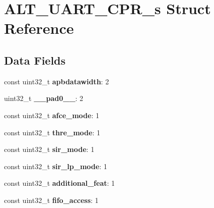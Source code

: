 \hypertarget{structALT__UART__CPR__s}{}\section{A\+L\+T\+\_\+\+U\+A\+R\+T\+\_\+\+C\+P\+R\+\_\+s Struct Reference}
\label{structALT__UART__CPR__s}
\subsection*{Data Fields}
\begin{DoxyCompactItemize}
\item 
\mbox{\label{structALT__UART__CPR__s_a5849f15933025a5b31f5bd877a296767}} 
const uint32\+\_\+t {\bfseries apbdatawidth}\+: 2
\item 
\mbox{\label{structALT__UART__CPR__s_ad73e5bea3527caaa2db495330cb9f0c0}} 
uint32\+\_\+t {\bfseries \+\_\+\+\_\+pad0\+\_\+\+\_\+}\+: 2
\item 
\mbox{\label{structALT__UART__CPR__s_a10cb860c4f7a423b00450eb90df72d30}} 
const uint32\+\_\+t {\bfseries afce\+\_\+mode}\+: 1
\item 
\mbox{\label{structALT__UART__CPR__s_ad19161f5074f440356b542fc1ffb2199}} 
const uint32\+\_\+t {\bfseries thre\+\_\+mode}\+: 1
\item 
\mbox{\label{structALT__UART__CPR__s_a2607a5fb15ea51166c56546d51aa8bc8}} 
const uint32\+\_\+t {\bfseries sir\+\_\+mode}\+: 1
\item 
\mbox{\label{structALT__UART__CPR__s_a7ad87fd35f74fc946af40274ff95d05a}} 
const uint32\+\_\+t {\bfseries sir\+\_\+lp\+\_\+mode}\+: 1
\item 
\mbox{\label{structALT__UART__CPR__s_a7e40975e41db9b584d490eb057620eef}} 
const uint32\+\_\+t {\bfseries additional\+\_\+feat}\+: 1
\item 
\mbox{\label{structALT__UART__CPR__s_a4edfe5ff6368ee44020e28f0faafa5dd}} 
const uint32\+\_\+t {\bfseries fifo\+\_\+access}\+: 1
\item 

\end{DoxyCompactItemize}
